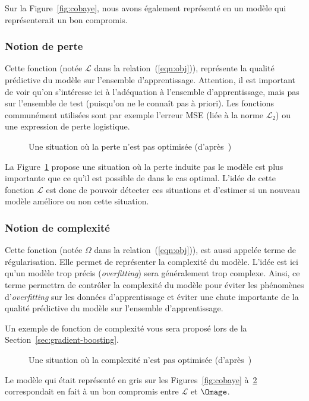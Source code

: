 Sur la Figure~\ref{fig:cobaye}, nous avons également représenté en  un modèle qui représenterait un bon compromis.

\subsubsection{Notion de perte}

Cette fonction (notée $\mathcal{L}$ dans la relation~(\ref{eqn:obj})), représente la qualité prédictive du modèle sur l'ensemble d'apprentissage. Attention, il est important de voir qu'on s'intéresse ici à l'adéquation à l'ensemble d'apprentissage, mais pas sur l'ensemble de test (puisqu'on ne le connaît pas à priori). Les fonctions communément utilisées sont par exemple l'erreur MSE (liée à la norme $\mathcal{L}_2$) ou une expression de perte logistique.

\begin{figure}[h]
	\begin{margincap}
	  \centering
	  
	  \caption{Une situation où la perte n'est pas optimisée (d'après~\cite{bib:xgboost-main})}
	  \label{fig:loss}
	\end{margincap}
\end{figure}

La Figure~\ref{fig:loss} propose une situation où la perte induite pas le modèle est plus importante que ce qu'il est possible de dans le cas optimal. L'idée de cette fonction $\mathcal{L}$ est donc de pouvoir détecter ces situations et d'estimer si un nouveau modèle améliore ou non cette situation.

\subsubsection{Notion de complexité}

Cette fonction (notée $\Omega$ dans la relation~(\ref{eqn:obj})), est aussi appelée terme de régularisation. Elle permet de représenter la complexité du modèle. L'idée est ici qu'un modèle trop précis (\textit{overfitting}) sera généralement trop complexe. Ainsi, ce terme permettra de contrôler la complexité du modèle pour éviter les phénomènes d'\textit{overfitting} sur les données d'apprentissage et éviter une chute importante de la qualité prédictive du modèle sur l'ensemble d'apprentissage.

Un exemple de fonction de complexité vous sera proposé lors de la Section~\ref{sec:gradient-boosting}.

\begin{figure}[h]
	\begin{margincap}
	  \centering
	  
	  \caption{Une situation où la complexité n'est pas optimisée (d'après~\cite{bib:xgboost-main})}
	  \label{fig:complexity}
	\end{margincap}
\end{figure}

Le modèle qui était représenté en gris sur les Figures~\ref{fig:cobaye} à~\ref{fig:complexity} correspondait en fait à un bon compromis entre $\mathcal{L}$ et $\Omage$.
